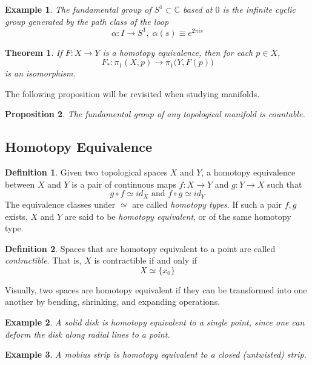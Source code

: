 \documentclass{article}
\newtheorem{theorem}{Theorem}[section]
\newtheorem{proposition}[theorem]{Proposition}
\newtheorem{example}{Example}[section]
\theoremstyle{remark}
\theoremstyle{definition}
\newtheorem{definition}{Definition}[section]
\begin{document}
\begin{example}
The fundamental group of $S^1 \subset \mathbb{C}$ based at $0$ is the infinite cyclic group generated by the path class of the loop
\[\alpha: I \longrightarrow S^1, \; \alpha(s) \equiv e^{2 \pi i s}\]
\end{example}

\begin{theorem}
If $F: X \longrightarrow Y$ is a homotopy equivalence, then for each $p \in X$, 
\[F_* : \pi_1 (X, p) \longrightarrow \pi_1 \big( Y, F(p) \big)\]
is an isomorphism. 
\end{theorem}

The following proposition will be revisited when studying manifolds. 

\begin{proposition}
The fundamental group of any topological manifold is countable. 
\end{proposition}

\subsection{Homotopy Equivalence}
\begin{definition}
Given two topological spaces $X$ and $Y$, a homotopy equivalence between $X$ and $Y$ is a pair of continuous maps $f:X \longrightarrow Y$ and $g: Y \longrightarrow X$ such that 
\[g \circ f \simeq id_X \text{ and } f \circ g \simeq id_Y\]
The equivalence classes under $\simeq$ are called \textit{homotopy types}. If such a pair $f, g$ exists, $X$ and $Y$ are said to be \textit{homotopy equivalent}, or of the same homotopy type. 
\end{definition}

\begin{definition}
Spaces that are homotopy equivalent to a point are called \textit{contractible}. That is, $X$ is contractible if and only if 
\[X \simeq \{x_0\}\]
\end{definition}

Visually, two spaces are homotopy equivalent if they can be transformed into one another by bending, shrinking, and expanding operations. 

\begin{example}
A solid disk is homotopy equivalent to a single point, since one can deform the disk along radial lines to a point. 
\end{example}

\begin{example}
A mobius strip is homotopy equivalent to a closed (untwisted) strip. 
\end{example}
\end{document}
